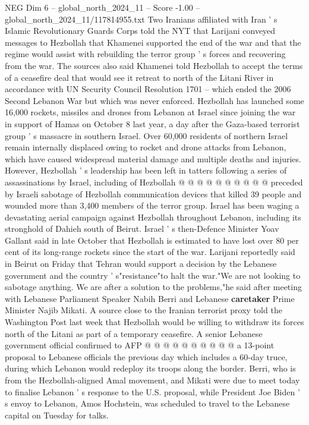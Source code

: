 \begin{textsample}{NEG Dim 6 – global\_north\_2024\_11 – Score -1.00 – global\_north\_2024\_11/117814955.txt}  \label{ex:f6_neg_165}
Two Iranians affiliated with Iran ' s Islamic Revolutionary Guards Corps told the NYT that Larijani conveyed messages to Hezbollah that Khamenei supported the end of the war and that the regime would assist with rebuilding the terror group ' s forces and recovering from the war.
The sources also said Khamenei told Hezbollah to accept the terms of a ceasefire deal that would see it retreat to north of the Litani River in accordance with UN Security Council Resolution 1701 -- which ended the 2006 Second Lebanon War but which was never enforced.
Hezbollah has launched some 16,000 rockets, missiles and drones from Lebanon at Israel since joining the war in support of Hamas on October 8 last year, a day after the Gaza-based terrorist group ' s massacre in southern Israel.
Over 60,000 residents of northern Israel remain internally displaced owing to rocket and drone attacks from Lebanon, which have caused widespread material damage and multiple deaths and injuries.
However, Hezbollah ' s leadership has been left in tatters following a series of assassinations by Israel, including of Hezbollah @ @ @ @ @ @ @ @ @ @ preceded by Israeli sabotage of Hezbollah communication devices that killed 39 people and wounded more than 3,400 members of the terror group.
Israel has been waging a devastating aerial campaign against Hezbollah throughout Lebanon, including its stronghold of Dahieh south of Beirut.
Israel ' s then-Defence Minister Yoav Gallant said in late October that Hezbollah is estimated to have lost over 80 per cent of its long-range rockets since the start of the war.
Larijani reportedly said in Beirut on Friday that Tehran would support a decision by the Lebanese government and the country ' s"resistance"to halt the war."We are not looking to sabotage anything.
We are after a solution to the problems,"he said after meeting with Lebanese Parliament Speaker Nabih Berri and Lebanese \textbf{caretaker} Prime Minister Najib Mikati.
A source close to the Iranian terrorist proxy told the Washington Post last week that Hezbollah would be willing to withdraw its forces north of the Litani as part of a temporary ceasefire.
A senior Lebanese government official confirmed to AFP @ @ @ @ @ @ @ @ @ @ a 13-point proposal to Lebanese officials the previous day which includes a 60-day truce, during which Lebanon would redeploy its troops along the border.
Berri, who is from the Hezbollah-aligned Amal movement, and Mikati were due to meet today to finalise Lebanon ' s response to the U.S. proposal, while President Joe Biden ' s envoy to Lebanon, Amos Hochstein, was scheduled to travel to the Lebanese capital on Tuesday for talks.

\end{textsample}

